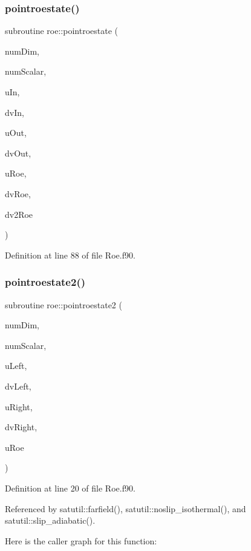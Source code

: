 \subsubsection{\texorpdfstring{pointroestate()}{pointroestate()}}
{\footnotesize\ttfamily subroutine roe\+::pointroestate (\begin{DoxyParamCaption}\item[{integer(kind=4), intent(in)}]{num\+Dim,  }\item[{integer(kind=4), intent(in)}]{num\+Scalar,  }\item[{real(kind=8), dimension(numdim+2+numscalar), intent(in), target}]{u\+In,  }\item[{real(kind=8), dimension(numdim+2), intent(in), target}]{dv\+In,  }\item[{real(kind=8), dimension(numdim+2+numscalar), intent(in), target}]{u\+Out,  }\item[{real(kind=8), dimension(numdim+2), intent(in), target}]{dv\+Out,  }\item[{real(kind=8), dimension(numdim+2+numscalar), intent(inout), target}]{u\+Roe,  }\item[{real(kind=8), dimension(numdim+2), intent(inout), target}]{dv\+Roe,  }\item[{real(kind=8), dimension(3), intent(inout), target}]{dv2\+Roe }\end{DoxyParamCaption})}



Definition at line 88 of file Roe.\+f90.

\hypertarget{namespaceroe_aa40cd6c8eebd973a90987a77c8efa884}{}\label{namespaceroe_aa40cd6c8eebd973a90987a77c8efa884} 
\subsubsection{\texorpdfstring{pointroestate2()}{pointroestate2()}}
{\footnotesize\ttfamily subroutine roe\+::pointroestate2 (\begin{DoxyParamCaption}\item[{integer(kind=4), intent(in)}]{num\+Dim,  }\item[{integer(kind=4), intent(in)}]{num\+Scalar,  }\item[{real(kind=8), dimension(numdim+2+numscalar), intent(in), target}]{u\+Left,  }\item[{real(kind=8), dimension(numdim+2), intent(in), target}]{dv\+Left,  }\item[{real(kind=8), dimension(numdim+2+numscalar), intent(in), target}]{u\+Right,  }\item[{real(kind=8), dimension(numdim+2), intent(in), target}]{dv\+Right,  }\item[{real(kind=8), dimension(numdim+2+numscalar), intent(inout), target}]{u\+Roe }\end{DoxyParamCaption})}



Definition at line 20 of file Roe.\+f90.



Referenced by satutil\+::farfield(), satutil\+::noslip\+\_\+isothermal(), and satutil\+::slip\+\_\+adiabatic().

Here is the caller graph for this function\+:
